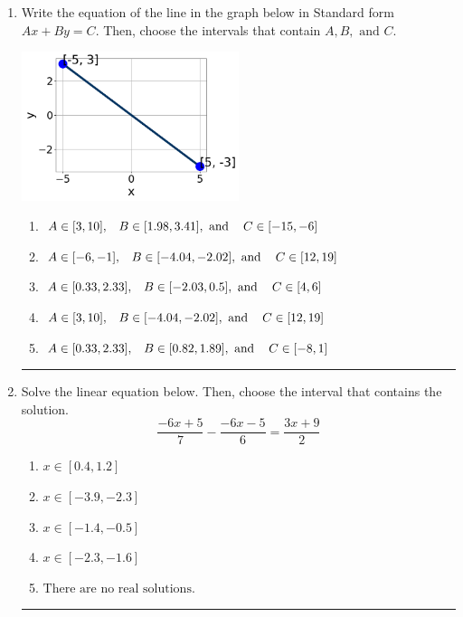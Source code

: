 \documentclass[14pt]{extbook}
\newcommand{\litem}[1]{\item#1\hspace*{-1cm}\rule{\textwidth}{0.4pt}}
\begin{document}
\begin{enumerate}
{\begin{enumerate}[label=\Alph*.]
\end{enumerate} }
\litem{
Write the equation of the line in the graph below in Standard form $Ax+By=C$. Then, choose the intervals that contain $A, B, \text{ and } C$.
\begin{center}
    \includegraphics[width=0.5\textwidth]{../Figures/linearGraphToStandardB.png}
\end{center}
\begin{enumerate}[label=\Alph*.]
\item \( A \in [3, 10], \hspace{3mm} B \in [1.98, 3.41], \text{ and } \hspace{3mm} C \in [-15, -6] \)
\item \( A \in [-6, -1], \hspace{3mm} B \in [-4.04, -2.02], \text{ and } \hspace{3mm} C \in [12, 19] \)
\item \( A \in [0.33, 2.33], \hspace{3mm} B \in [-2.03, 0.5], \text{ and } \hspace{3mm} C \in [4, 6] \)
\item \( A \in [3, 10], \hspace{3mm} B \in [-4.04, -2.02], \text{ and } \hspace{3mm} C \in [12, 19] \)
\item \( A \in [0.33, 2.33], \hspace{3mm} B \in [0.82, 1.89], \text{ and } \hspace{3mm} C \in [-8, 1] \)

\end{enumerate} }
\litem{
Solve the linear equation below. Then, choose the interval that contains the solution.\[ \frac{-6x + 5}{7} - \frac{-6x -5}{6} = \frac{3x + 9}{2} \]\begin{enumerate}[label=\Alph*.]
\item \( x \in [0.4, 1.2] \)
\item \( x \in [-3.9, -2.3] \)
\item \( x \in [-1.4, -0.5] \)
\item \( x \in [-2.3, -1.6] \)
\item \( \text{There are no real solutions.} \)


\end{enumerate}}
\end{enumerate}
\end{document}
